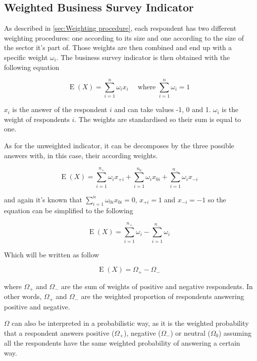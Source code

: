 \documentclass[12pt,a4paper,oneside]{book}
\DeclareMathOperator{\E}{E}
\begin{document}
\subsection{Weighted Business Survey Indicator}

As described in \autoref{sec:Weighting procedure}, each respondent has two different weighting procedures: one according to its size and one according to the size of the sector it's part of. Those weights are then combined and end up with a specific weight $\omega_i$.
The business survey indicator is then obtained with the following equation 

\begin{equation}
    \E(X) = \sum_{i=1}^n \omega_i x_i  \quad \text{  where  } \sum_{i=1}^n \omega_i =  1
\end{equation} 

$x_i$ is the answer of the respondent $i$ and can take values -1, 0 and 1.
$\omega_i$ is the weight of respondents $i$. 
The weights are standardised so their sum is equal to one.

As for the unweighted indicator, it can be decomposes by the three possible answers with, in this case, their according weights.

\begin{equation}
    \E(X) = \sum_{i=1}^{n_+} \omega_{i} x_{+i} + \sum_{i=1}^{n_0} \omega_{i} x_{0i} + \sum_{i=1}^{n_-} \omega_{i} x_{-i}
 \end{equation}

and again it's known that $\sum_{i=1}^n \omega_{0i} x_{0i} = 0$, $x_{+i} = 1$ and $x_{-i}=-1$ so the equation can be simplified to the following

\begin{equation}
    \E(X) = \sum_{i=1}^{n_+} \omega_{i}  - \sum_{i=1}^{n_-} \omega_{i}
\end{equation}

Which will be written as follow

\begin{equation}
    \E(X) = \Omega_+ - \Omega_- \label{eq: BSI Weighted}
\end{equation}

where $\Omega_+$ and $\Omega_-$ are the sum of weights of positive and negative respondents. 
In other words, $\Omega_+$ and $\Omega_-$ are the weighted proportion of respondents answering positive and negative. 

$\Omega$ can also be interpreted in a probabilistic way, as it is the weighted probability that a respondent answers positive ($\Omega_+$), negative ($\Omega_-$) or neutral ($\Omega_0$) assuming all the respondents have the same weighted probability of answering a certain way.
\end{document}
